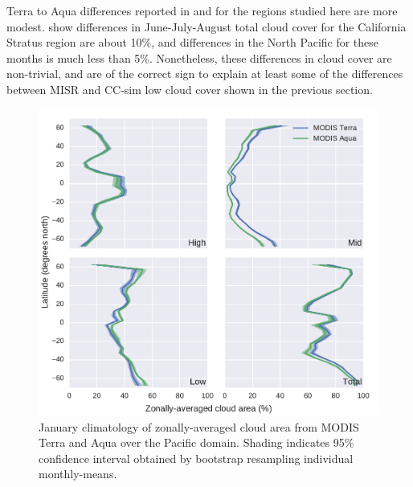 Terra to Aqua differences reported in \cite{king_et_al_2013} and \cite{meskhidze_et_al_2009} for the regions studied here are more modest. \cite{king_et_al_2013} show differences in June-July-August total cloud cover for the California Stratus region are about 10\%, and differences in the North Pacific for these months is much less than 5\%. Nonetheless, these differences in cloud cover are non-trivial, and are of the correct sign to explain at least some of the differences between MISR and CC-sim low cloud cover shown in the previous section.

\begin{figure}
\centering
\includegraphics[width=\columnwidth]{graphics/misr_cldmodis_zonal_2008-01.pdf}
\caption{January climatology of zonally-averaged cloud area from MODIS Terra and Aqua over the Pacific domain. Shading indicates 95\% confidence interval obtained by bootstrap resampling individual monthly-means.}
\label{misr_cldmodis_zonal_january}
\end{figure}

